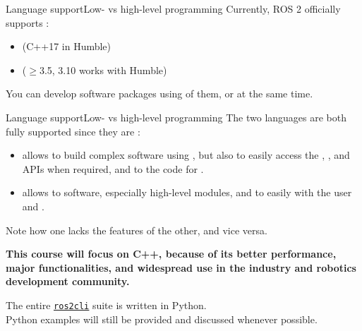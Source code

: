 \begin{frame}{Language support}{Low- vs high-level programming}
  Currently, ROS 2 officially supports :
  \begin{itemize}
    \item {} (C++17 in Humble)
    \item {} ($\geq$3.5, 3.10 works with Humble)
  \end{itemize}
  You can develop software packages using  of them, or  at the same time.
\end{frame}
\begin{frame}{Language support}{Low- vs high-level programming}
  The two languages are both fully supported since they are :
  \begin{itemize}
    \item {} allows to build complex software using , but also to easily access the , , and  APIs when required, and to  the code for .
    \item {} allows to  software, especially high-level modules, and to easily  with the user and .
  \end{itemize}
  Note how one lacks the features of the other, and vice versa.
  \begin{block}{}
    \centering
    \textbf{This course will focus on C++, because of its better performance, major functionalities, and widespread use in the industry and robotics development community.}
  \end{block}
  The entire \href{https://github.com/ros2/ros2cli/tree/humble}{\color{blue}\underline{\texttt{ros2cli}}} suite is written in Python.\\
  Python examples will still be provided and discussed whenever possible.
\end{frame}
